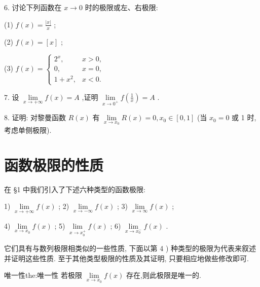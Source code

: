 6. 讨论下列函数在 \(x \rightarrow  0\) 时的极限或左、右极限:

(1) \(f\left( x\right)  = \frac{\left| x\right| }{x}\) ;

(2) \(f\left( x\right)  = \left\lbrack  x\right\rbrack\) ;

(3) \(f\left( x\right)  = \left\{  \begin{array}{ll} {2}^{x}, & x > 0, \\  0, & x = 0, \\  1 + {x}^{2}, & x < 0. \end{array}\right.\)

7. 设 \(\mathop{\lim }\limits_{{x \rightarrow   + \infty }}f\left( x\right)  = A\) ,证明 \(\mathop{\lim }\limits_{{x \rightarrow  {0}^{ + }}}f\left( \frac{1}{x}\right)  = A\) .

8. 证明: 对黎曼函数 \(R\left( x\right)\) 有 \(\mathop{\lim }\limits_{{x \rightarrow  {x}_{0}}}R\left( x\right)  = 0,{x}_{0} \in  \left\lbrack  {0,1}\right\rbrack\) (当 \({x}_{0} = 0\) 或 1 时,考虑单侧极限).

\section{函数极限的性质}

在 §1 中我们引入了下述六种类型的函数极限:

1) \(\mathop{\lim }\limits_{{x \rightarrow   + \infty }}f\left( x\right)\) ; 2) \(\mathop{\lim }\limits_{{x \rightarrow   - \infty }}f\left( x\right)\) ; 3) \(\mathop{\lim }\limits_{{x \rightarrow  \infty }}f\left( x\right)\) ;

4) \(\mathop{\lim }\limits_{{x \rightarrow  {x}_{0}}}f\left( x\right)\) ; 5) \(\mathop{\lim }\limits_{{x \rightarrow  {x}_{0}^{ + }}}f\left( x\right)\) ; 6) \(\mathop{\lim }\limits_{{x \rightarrow  {x}_{0}^{ - }}}f\left( x\right)\) .

它们具有与数列极限相类似的一些性质, 下面以第 4 ) 种类型的极限为代表来叙述并证明这些性质. 至于其他类型极限的性质及其证明, 只要相应地做些修改即可.

\begin{theorem}{唯一性}{the:唯一性}
若极限 \(\mathop{\lim }\limits_{{x \rightarrow  {x}_{0}}}f\left( x\right)\) 存在,则此极限是唯一的.
\end{theorem}

